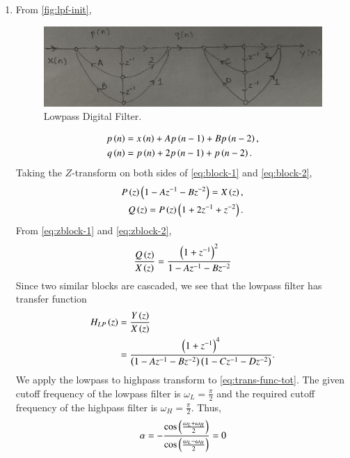 \documentclass[journal,12pt,twocolumn]{IEEEtran}
\begin{document}
\begin{enumerate}[label=\theenumi.]
    \item From \autoref{fig:lpf-init},
    \begin{figure}[!ht]
        \centering
        \includegraphics[width=\columnwidth]{figs/lpf-init.jpg}
        \caption{Lowpass Digital Filter.}
        \label{fig:lpf-init}
    \end{figure}
    \begin{align}
        p\left(n\right) &= x\left(n\right) + Ap\left(n-1\right) + Bp\left(n-2\right), \label{eq:block-1} \\
        q\left(n\right) &= p\left(n\right) + 2p\left(n-1\right) + p\left(n-2\right). \label{eq:block-2}
    \end{align}
    Taking the \(Z\)-transform on both sides of \eqref{eq:block-1} and
    \eqref{eq:block-2},
    \begin{align}
        P\left(z\right)\left(1-Az^{-1}-Bz^{-2}\right) = X\left(z\right), \label{eq:zblock-1} \\
        Q\left(z\right) = P\left(z\right)\left(1+2z^{-1}+z^{-2}\right). \label{eq:zblock-2}
    \end{align}
    From \eqref{eq:zblock-1} and \eqref{eq:zblock-2},
    \begin{equation}
        \frac{Q\left(z\right)}{X\left(z\right)} = \frac{\left(1+z^{-1}\right)^2}{1-Az^{-1}-Bz^{-2}}
        \label{eq:trans-func-block}
    \end{equation}
    Since two similar blocks are cascaded, we see that the lowpass filter has
    transfer function
    \begin{align}
        H_{LP}\left(z\right) &= \frac{Y\left(z\right)}{X\left(z\right)} \\
        &= \frac{\left(1+z^{-1}\right)^4}{\left(1-Az^{-1}-Bz^{-2}\right)\left(1-Cz^{-1}-Dz^{-2}\right)}.
        \label{eq:trans-func-tot}
    \end{align}
    We apply the lowpass to highpass transform to \eqref{eq:trans-func-tot}. The
    given cutoff frequency of the lowpass filter is \(\omega_L = \frac{\pi}{2}\)
    and the required cutoff frequency of the highpass filter is \(\omega_H =
    \frac{\pi}{2}\). Thus,
    \begin{equation}
        \alpha = -\frac{\cos\brak{\frac{\omega_L+\omega_H}{2}}}{\cos\brak{\frac{\omega_L-\omega_H}{2}}} = 0

\end{equation}
\end{enumerate}
\end{document}
